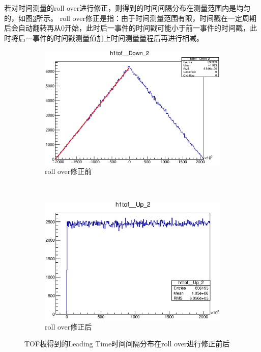 若对时间测量的roll over进行修正，则得到的时间间隔分布在测量范围内是均匀的，如图\ref{fig:tof_interval_rollover}所示。
roll over修正是指：由于时间测量范围有限，时间戳在一定周期后会自动翻转再从0开始，此时后一事件的时间戳可能小于前一事件的时间戳，此时将后一事件的时间戳测量值加上时间测量量程后再进行相减。
\begin{figure}[htbp]
	\centering
	\begin{subfigure}[b]{0.48\textwidth}
        \includegraphics[width=\textwidth]{fig/tof_interval.eps}
        \caption{roll over修正前}
        \label{fig:tof_interval}
    \end{subfigure}
~
    \begin{subfigure}[b]{0.48\textwidth}
        \includegraphics[width=\textwidth]{fig/tof_interval_correct_rollover.eps}
        \caption{roll over修正后}
        \label{fig:tof_interval_correct_rollover}
    \end{subfigure}
	\caption{TOF板得到的Leading Time时间间隔分布在roll over进行修正前后}
	\label{fig:tof_interval_rollover}
\end{figure}


